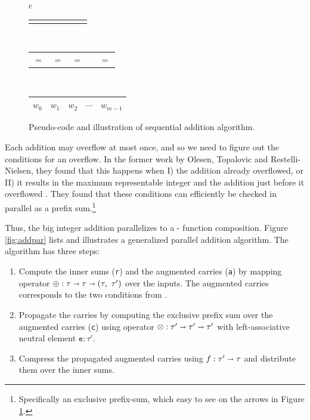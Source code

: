 \begin{figure}
\begin{minipage}{0.45\textwidth}
\begin{tabular}{c}
      \begin{tabular}{C{0.15cm}C{0.15cm}C{0.15cm}C{0.15cm}C{0.15cm}C{0.15cm}C{0.15cm}}
       \diagonalarrow{} & & \diagonalarrow{} &  & \diagonalarrow{} &  & \diagonalarrow{}\\
      \end{tabular}\\[-2ex]
      \begin{tabular}{C{0.7cm}C{0.7cm}C{0.8cm}C{0.7cm}C{0.7cm}}
        $=$ & $=$ & $=$ &  & $=$  
      \end{tabular}\\
      \begin{tabular}{|C{0.7cm}|C{0.7cm}|C{0.7cm}|C{0.7cm}|C{0.7cm}|}
        \hline
        $w_{0}$ & $w_1$ & $w_2$ & $\cdots$ & $w_{m-1}$\\
        \hline
      \end{tabular}
    \end{tabular}
  \end{minipage}
  \caption{\footnotesize Pseudo-code and illustration of sequential addition algorithm.}
  \label{fig:addseq}
\end{figure}

Each addition may overflow at most once, and so we need to figure out the
conditions for an overflow. In the former work by Olesen, Topalovic and
Restelli-Nielsen, they found that this happens when I) the addition already
overflowed, or II) it results in the maximum representable integer and the
addition just before it overflowed \cite{DPPproject}. They found that these
conditions can efficiently be checked in parallel as a prefix
sum.\footnote{Specifically an exclusive prefix-sum, which easy to see on the
  arrows in Figure \ref{fig:addseq}.}

Thus, the big integer addition parallelizes to a - function
composition. Figure \ref{fig:addpar} lists and illustrates a generalized
parallel addition algorithm. The algorithm has three steps:
\begin{enumerate}
\item Compute the inner sums (\texttt{r}) and the augmented carries (\texttt{a})
  by mapping operator
  $\oplus:\tau \shortrightarrow \tau \shortrightarrow (\tau,~\tau')$ over the inputs. The
  augmented carries corresponds to the two conditions from \cite{DPPproject}.
  
\item Propagate the carries by computing the exclusive prefix sum over the
  augmented carries (\texttt{c}) using operator $\otimes:\tau' \shortrightarrow \tau' \shortrightarrow \tau'$ with left-associative
  neutral element $\mathtt{e}:\tau'$.

\item Compress the propagated augmented carries using
  $f:\tau' \shortrightarrow \tau$ and distribute them over the inner sums.
\end{enumerate}

